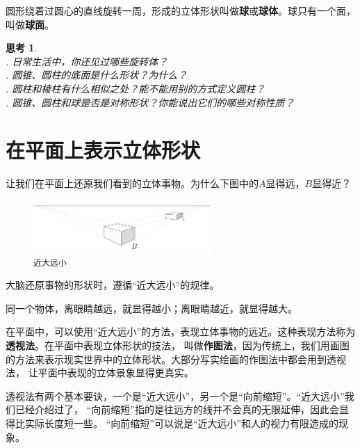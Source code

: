 \documentclass[12pt,UTF8]{ctexbook}
\newtheorem{sk}{思考}[section]
\begin{document}
圆形绕着过圆心的直线旋转一周，形成的立体形状叫做\textbf{球}或\textbf{球体}。球只有一个面，叫做\textbf{球面}。

\begin{sk}
    \mbox{}\\
    . 日常生活中，你还见过哪些旋转体？\\
    . 圆锥、圆柱的底面是什么形状？为什么？\\
    . 圆柱和棱柱有什么相似之处？能不能用别的方式定义圆柱？\\
    . 圆锥、圆柱和球是否是对称形状？你能说出它们的哪些对称性质？
\end{sk}

\section{在平面上表示立体形状}

让我们在平面上还原我们看到的立体事物。为什么下图中的$A$显得远，$B$显得近？

\begin{figure}[h] %
    \centering
    \includegraphics[width=0.6\textwidth]{透视1.png}
    \caption*{\texttt{近大远小}}
\end{figure}

大脑还原事物的形状时，遵循“近大远小”的规律。

同一个物体，离眼睛越远，就显得越小；离眼睛越近，就显得越大。

在平面中，可以使用“近大远小”的方法，表现立体事物的远近。这种表现方法称为\textbf{透视法}。在平面中表现立体形状的技法，
叫做\textbf{作图法}，因为传统上，我们用画图的方法来表示现实世界中的立体形状。大部分写实绘画的作图法中都会用到透视法，
让平面中表现的立体景象显得更真实。

透视法有两个基本要诀，一个是“近大远小”，另一个是“向前缩短”。“近大远小”我们已经介绍过了，
“向前缩短”指的是往远方的线并不会真的无限延伸，因此会显得比实际长度短一些。
“向前缩短”可以说是“近大远小”和人的视力有限造成的现象。
\end{document}
